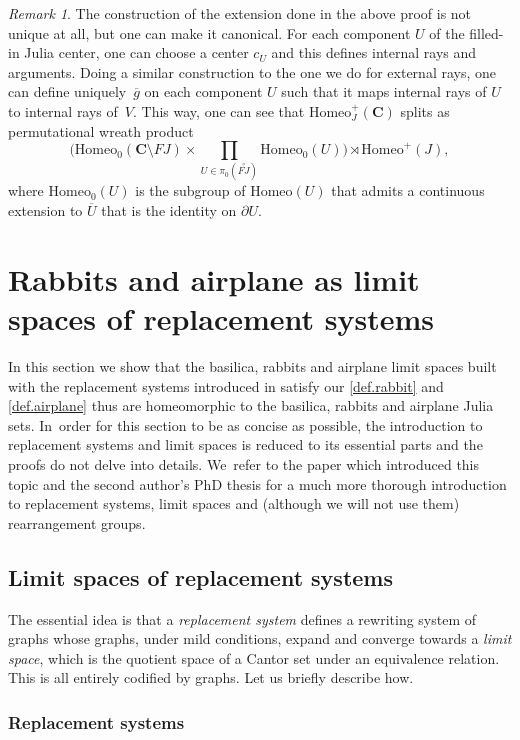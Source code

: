 \documentclass[JEP,XML,SOM,Unicode,NoFloatCountersInSection,published]{cedram}
\theoremstyle{plain}
\theoremstyle{definition}
\theoremstyle{remark}
\newtheorem{remark}[theorem]{Remark}
\newcommand{\Homeo}{\mathrm{Homeo}}
\newcommand{\interior}[1]{\overset{\circ}{#1}}
\newcommand{\C}{\mathbf{C}}
\begin{document}
\begin{remark} The construction of the extension done in the above proof is not unique at all, but one can make it canonical. For each component $U$ of the filled-in Julia center, one can choose a center $c_U$ and this defines internal rays and arguments. Doing a similar construction to the one we do for external rays, one can define uniquely~$\overline{g}$ on each component $U$ such that it maps internal rays of $U$ to internal rays of~$V$.
This way, one can see that $\Homeo^+_J(\C)$ splits as permutational wreath product
\[
\biggl(\Homeo_0(\C\setminus FJ)\times\prod_{U\in\pi_0(\interior{FJ})}\Homeo_0(U)\biggr)\rtimes \Homeo^+(J),
\]
where $\Homeo_0(U)$ is the subgroup of $\Homeo(U)$ that admits a continuous extension to $\overline{U}$ that is the identity on $\partial U$.
\end{remark}

\section{Rabbits and airplane as limit spaces of replacement systems}
\label{sec.limit.spaces}

In this section we show that the basilica, rabbits and airplane limit spaces built with the replacement systems introduced in \cite{Belk-Forrest} satisfy our \cref{def.rabbit} and \cref{def.airplane} thus are homeomorphic to the basilica, rabbits and airplane Julia sets. In~order for this section to be as concise as possible, the introduction to replacement systems and limit spaces is reduced to its essential parts and the proofs do not delve into details. We~refer to the paper which introduced this topic \cite{Belk-Forrest} and the second author's PhD thesis \cite{thesis} for a much more thorough introduction to replacement systems, limit spaces and (although we will not use them) rearrangement groups.

\subsection{Limit spaces of replacement systems}

The essential idea is that a \textit{replacement system} defines a rewriting system of graphs whose graphs, under mild conditions, expand and converge towards a \textit{limit space}, which is the quotient space of a Cantor set under an equivalence relation.
This is all entirely codified by graphs.
Let us briefly describe how.

\subsubsection{Replacement systems}
\end{document}
